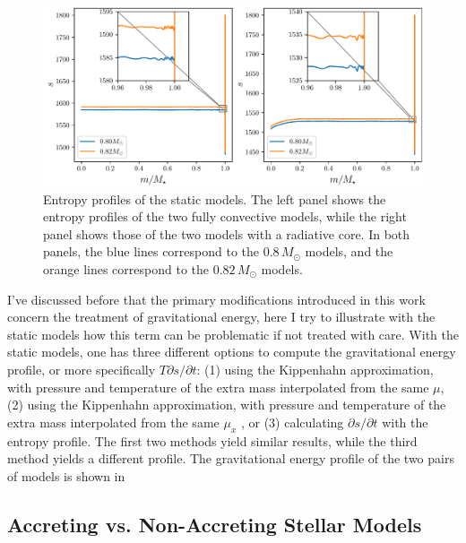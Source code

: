 \documentclass[12pt,a4paper]{article}
\newcommand{\lpfird}[2][]{\partial#1/\partial#2}
\begin{document}
\begin{figure}
  \centering  
  \includegraphics[width=\textwidth,keepaspectratio]{toy_problem_entropy.pdf}
  \caption{Entropy profiles of the static models. The left panel shows the entropy profiles of the two fully convective models, while the right panel shows those of the two models with a radiative core. In both panels, the blue lines correspond to the $0.8\,M_\odot$ models, and the orange lines correspond to the $0.82\,M_\odot$ models.} \label{fig:toy_problem_entropy}
\end{figure}

I've discussed before that the primary modifications introduced in this work concern the treatment of gravitational energy, here I try to illustrate with the static models how this term can be problematic if not treated with care. With the static models, one has three different options to compute the gravitational energy profile, or more specifically $T\lpfird[s]{t}$: (1) using the Kippenhahn approximation, with pressure and temperature of the extra mass interpolated from the same $\mu$, (2) using the Kippenhahn approximation, with pressure and temperature of the extra mass interpolated from the same $\mu_x$ , or (3) calculating $\lpfird[s]{t}$ with the entropy profile. The first two methods yield similar results, while the third method yields a different profile. The gravitational energy profile of the two pairs of models is shown in %

\subsection{Accreting vs. Non-Accreting Stellar Models}
\label{sec:accretion_vs_non_accretion}
\end{document}
